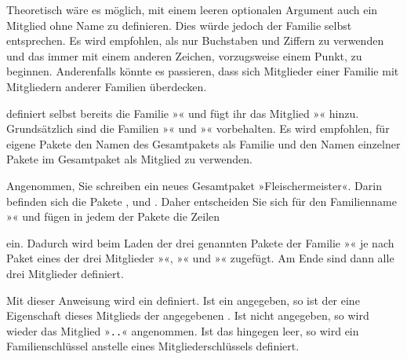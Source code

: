 Theoretisch wäre es möglich, mit einem leeren optionalen Argument
 auch ein Mitglied ohne Name zu definieren. Dies würde jedoch
der Familie selbst entsprechen. Es wird empfohlen, als  nur
Buchstaben und Ziffern zu verwenden und das  immer mit einem
anderen Zeichen, vorzugsweise einem Punkt, zu beginnen. Anderenfalls könnte
es passieren, dass sich Mitglieder einer Familie mit Mitgliedern anderer
Familien überdecken.

 definiert selbst bereits die Familie »« und
fügt ihr das Mitglied »« hinzu. Grundsätzlich sind die
Familien »« und »« \KOMAScript{} vorbehalten. Es
wird empfohlen, für eigene Pakete den Namen des Gesamtpakets als Familie und
den Namen einzelner Pakete im Gesamtpaket als Mitglied zu verwenden.
%
\begin{Example}
  Angenommen, Sie schreiben ein neues Gesamtpaket »Fleischermeister«. Darin
  befinden sich die Pakete ,  und
  . Daher entscheiden Sie sich für den Familienname
  »« und fügen in jedem der Pakete die Zeilen
\begin{lstcode}
\end{lstcode}
  ein. Dadurch wird beim Laden der drei genannten Pakete der Familie
  »« je nach Paket eines der drei Mitglieder
  »«, »« und
  »« zugefügt. Am Ende sind dann alle drei Mitglieder
  definiert.
\end{Example}
%
\EndIndexGroup
\ExampleEndFix


\begin{Declaration}
\end{Declaration}
Mit dieser Anweisung wird ein  definiert. Ist ein
 angegeben, so ist der  eine Eigenschaft
dieses Mitglieds der angegebenen . Ist
 nicht angegeben, so wird wieder das Mitglied
»\texttt{.}\texttt{.}« angenommen. Ist das
 hingegen leer, so wird ein Familienschlüssel anstelle eines
Mitgliederschlüssels definiert.

